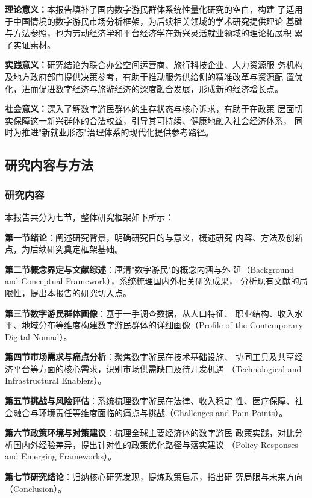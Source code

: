 \documentclass[12pt,a4paper]{article}
\begin{document}
\textbf{理论意义：}本报告填补了国内数字游民群体系统性量化研究的空白，构建
了适用于中国情境的数字游民市场分析框架，为后续相关领域的学术研究提供理论
基础与方法参照，也为劳动经济学和平台经济学在新兴灵活就业领域的理论拓展积
累了实证素材。

\textbf{实践意义：}研究结论为联合办公空间运营商、旅行科技企业、人力资源服
务机构及地方政府部门提供决策参考，有助于推动服务供给侧的精准改革与资源配
置优化，进而促进数字经济与旅游经济的深度融合发展，形成新的经济增长点。

\textbf{社会意义：}深入了解数字游民群体的生存状态与核心诉求，有助于在政策
层面切实保障这一新兴群体的合法权益，引导其可持续、健康地融入社会经济体系，
同时为推进"新就业形态"治理体系的现代化提供参考路径。

\subsection{研究内容与方法}

\subsubsection{研究内容}

本报告共分为七节，整体研究框架如下所示：

\textbf{第一节\enspace 绪论}：阐述研究背景，明确研究目的与意义，概述研究
内容、方法及创新点，为后续研究奠定框架基础。

\textbf{第二节\enspace 概念界定与文献综述}：厘清"数字游民"的概念内涵与外
延（Background and Conceptual Framework），系统梳理国内外相关研究成果，
分析现有文献的局限性，提出本报告的研究切入点。

\textbf{第三节\enspace 数字游民群体画像}：基于一手调查数据，从人口特征、
职业结构、收入水平、地域分布等维度构建数字游民群体的详细画像（Profile of
the Contemporary Digital Nomad）。

\textbf{第四节\enspace 市场需求与痛点分析}：聚焦数字游民在技术基础设施、
协同工具及共享经济平台等方面的核心需求，识别市场供需缺口及待开发机遇
（Technological and Infrastructural Enablers）。

\textbf{第五节\enspace 挑战与风险评估}：系统梳理数字游民在法律、收入稳定
性、医疗保障、社会融合与环境责任等维度面临的痛点与挑战（Challenges and
Pain Points）。

\textbf{第六节\enspace 政策环境与对策建议}：梳理全球主要经济体的数字游民
政策实践，对比分析国内外经验差异，提出针对性的政策优化路径与落实建议
（Policy Responses and Emerging Frameworks）。

\textbf{第七节\enspace 研究结论}：归纳核心研究发现，提炼政策启示，指出研
究局限与未来方向（Conclusion）。
\end{document}
